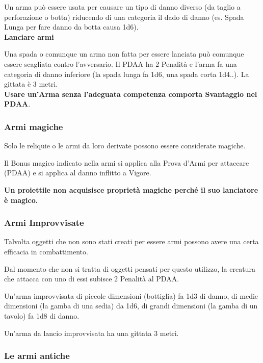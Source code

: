 \documentclass[12pt,a4paper,twoside,openany]{book}
\begin{document}
\begin{multicols}{2}
Un arma può essere usata per causare un tipo di danno diverso (da taglio a perforazione o botta) riducendo di una categoria il dado di danno (es. Spada Lunga per fare danno da botta causa 1d6).\\

\textbf{Lanciare armi}

Una spada o comunque un arma non fatta per essere lanciata può comunque essere scagliata contro l'avversario. Il PDAA ha 2 Penalità e l'arma fa una categoria di danno inferiore (la spada lunga fa 1d6, una spada corta 1d4..). La gittata è 3 metri.\\

\textbf{Usare un'Arma senza l'adeguata competenza comporta Svantaggio nel PDAA}.

\subsubsection{Armi magiche}	

Solo le reliquie o le armi da loro derivate possono essere considerate magiche.

Il Bonus magico indicato nella armi si applica alla Prova d'Armi per attaccare (PDAA) e si applica al danno inflitto a Vigore.

\textbf{Un proiettile non acquisisce proprietà magiche perché il suo lanciatore è magico.}


\subsubsection{Armi Improvvisate}

Talvolta oggetti che non sono stati creati per essere armi possono avere una certa efficacia in combattimento.


Dal momento che non si tratta di oggetti pensati per questo utilizzo, la creatura che attacca con uno di essi subisce 2 Penalità al PDAA.

Un'arma improvvisata di piccole dimensioni (bottiglia) fa 1d3 di danno, di medie dimensioni (la gamba di una sedia) da 1d6, di grandi dimensioni (la gamba di un tavolo) fa 1d8 di danno.

Un'arma da lancio improvvisata ha una gittata 3 metri.


\subsubsection{Le armi antiche}


\end{multicols}
\end{document}
